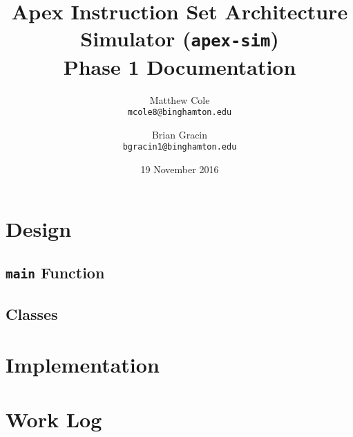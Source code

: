\documentclass[12pt]{article}
\title{Apex Instruction Set Architecture Simulator (\texttt{apex-sim}) \\ Phase 1 Documentation}
\author{Matthew Cole \\ \texttt{mcole8@binghamton.edu}
\and
Brian Gracin \\ 
	\texttt{bgracin1@binghamton.edu}}
\date{19 November 2016} %
\begin{document}
\maketitle
\newpage

\section{Design}
\subsection{\texttt{main} Function}
\blindtext

\subsection{Classes}
\blindtext

\section{Implementation}
\blindtext

\section{Work Log}
\blindtext
\end{document}
